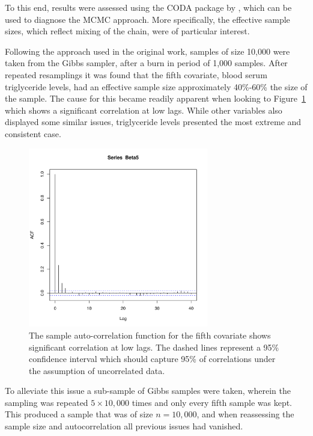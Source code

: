 \documentclass{uwstat572}
\begin{document}
To this end, results were assessed using the CODA package by \cite{codapackage}, which can be used to diagnose the MCMC approach. More specifically, the effective sample sizes, which reflect mixing of the chain, were of particular interest.

Following the approach used in the original work, samples of size 10,000 were taken from the Gibbs sampler, after a burn in period of 1,000 samples. After repeated resamplings it was found that the fifth covariate, blood serum triglyceride levels, had an effective sample size approximately 40\%-60\% the size of the sample. The cause for this became readily apparent when looking to Figure~\ref{Var5} which shows a significant correlation at low lags. While other variables also displayed some similar issues, triglyceride levels presented the most extreme and consistent case.

\begin{figure}\label{Var5}
  \centering
    \includegraphics[width=0.7\textwidth]{Beta5ACFunsub.pdf}
  \caption{The sample auto-correlation function for the fifth covariate shows significant correlation at low lags. The dashed lines represent a 95\% confidence interval which should capture 95\% of correlations under the assumption of uncorrelated data.}
\end{figure}

To alleviate this issue a sub-sample of Gibbs samples were taken, wherein the sampling was repeated $5 \times 10,000$ times and only every fifth sample was kept. This produced a sample that was of size $n=10,000$, and when reassessing the sample size and autocorrelation all previous issues had vanished.
\end{document}
